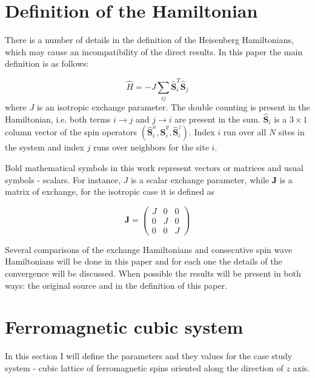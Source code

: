 \documentclass[a4paper,12pt]{article}
\begin{document}
    \section{Definition of the Hamiltonian}

        There is a number of details in the definition of the Heisenberg Hamiltonians, which may cause an incompatibility of the direct results. 
        In this paper the main definition is as follows:

        \begin{equation}
            \hat{H} = -J \sum_{ij} \hat{\mathbf{S}}_i^T \hat{\mathbf{S}}_j
            \label{eq:hh-main}
        \end{equation}
        where $J$ is an isotropic exchange parameter. The double counting is present in the Hamiltonian, i.e. both terms $i\rightarrow j$ and $j \rightarrow i$ are present in the sum. 
        $\hat{\mathbf{S}}_i$ is a $3\times1$ column vector of the spin operators $(\hat{\mathbf{S}}_i^x, \hat{\mathbf{S}}_i^y, \hat{\mathbf{S}}_i^z)$. 
        Index $i$ run over all $N$ sites in the system and index $j$ runs over neighbors for the site $i$. 

        Bold mathematical symbols in this work represent vectors or matrices and usual symbols - scalars. For instance, $J$ is a scalar exchange parameter, while $\mathbf{J}$ is a matrix of exchange, 
        for the isotropic case it is defined as

        \begin{equation}
            \mathbf{J} =
            \begin{pmatrix}
                J & 0 & 0 \\
                0 & J & 0 \\
                0 & 0 & J
            \end{pmatrix}
        \end{equation}

        Several comparisons of the exchange Hamiltonians and consecutive spin wave Hamiltonians will be done in this paper and for each one the details of the convergence will be discussed. 
        When possible the results will be present in both ways: the original source and in the definition of this paper.

    \section{Ferromagnetic cubic system}

        In this section I will define the parameters and they values for the case study system - 
        cubic lattice of ferromagnetic spins oriented along the direction of $z$ axis.
\end{document}
